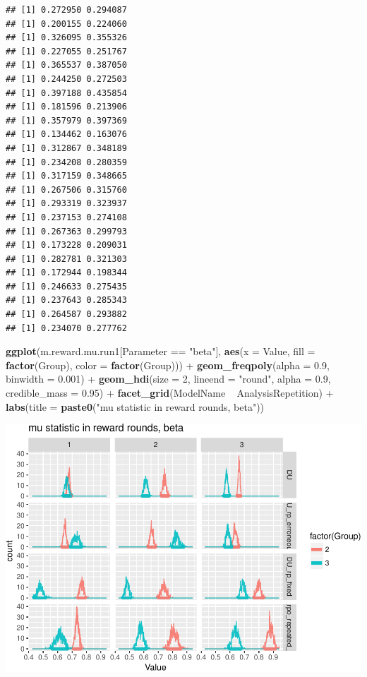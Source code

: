 \documentclass[]{article}
\newenvironment{Shaded}{\begin{snugshade}}{\end{snugshade}}
\newcommand{\KeywordTok}[1]{\textcolor[rgb]{0.13,0.29,0.53}{\textbf{{#1}}}}
\newcommand{\DataTypeTok}[1]{\textcolor[rgb]{0.13,0.29,0.53}{{#1}}}
\newcommand{\DecValTok}[1]{\textcolor[rgb]{0.00,0.00,0.81}{{#1}}}
\newcommand{\FloatTok}[1]{\textcolor[rgb]{0.00,0.00,0.81}{{#1}}}
\newcommand{\StringTok}[1]{\textcolor[rgb]{0.31,0.60,0.02}{{#1}}}
\newcommand{\NormalTok}[1]{{#1}}
\begin{document}
\begin{verbatim}
## [1] 0.272950 0.294087
## [1] 0.200155 0.224060
## [1] 0.326095 0.355326
## [1] 0.227055 0.251767
## [1] 0.365537 0.387050
## [1] 0.244250 0.272503
## [1] 0.397188 0.435854
## [1] 0.181596 0.213906
## [1] 0.357979 0.397369
## [1] 0.134462 0.163076
## [1] 0.312867 0.348189
## [1] 0.234208 0.280359
## [1] 0.317159 0.348665
## [1] 0.267506 0.315760
## [1] 0.293319 0.323937
## [1] 0.237153 0.274108
## [1] 0.267363 0.299793
## [1] 0.173228 0.209031
## [1] 0.282781 0.321303
## [1] 0.172944 0.198344
## [1] 0.246633 0.275435
## [1] 0.237643 0.285343
## [1] 0.264587 0.293882
## [1] 0.234070 0.277762
\end{verbatim}

\begin{Shaded}
\begin{Highlighting}[]
\KeywordTok{ggplot}\NormalTok{(m.reward.mu.run1[Parameter ==}\StringTok{ "beta"}\NormalTok{], }\KeywordTok{aes}\NormalTok{(}\DataTypeTok{x =} \NormalTok{Value, }\DataTypeTok{fill =} \KeywordTok{factor}\NormalTok{(Group), }
    \DataTypeTok{color =} \KeywordTok{factor}\NormalTok{(Group))) +}\StringTok{ }\KeywordTok{geom_freqpoly}\NormalTok{(}\DataTypeTok{alpha =} \FloatTok{0.9}\NormalTok{, }\DataTypeTok{binwidth =} \FloatTok{0.001}\NormalTok{) +}\StringTok{ }
\StringTok{    }\KeywordTok{geom_hdi}\NormalTok{(}\DataTypeTok{size =} \DecValTok{2}\NormalTok{, }\DataTypeTok{lineend =} \StringTok{"round"}\NormalTok{, }\DataTypeTok{alpha =} \FloatTok{0.9}\NormalTok{, }\DataTypeTok{credible_mass =} \FloatTok{0.95}\NormalTok{) +}\StringTok{ }
\StringTok{    }\KeywordTok{facet_grid}\NormalTok{(ModelName ~}\StringTok{ }\NormalTok{AnalysisRepetition) +}\StringTok{ }\KeywordTok{labs}\NormalTok{(}\DataTypeTok{title =} \KeywordTok{paste0}\NormalTok{(}\StringTok{"mu statistic in reward rounds, beta"}\NormalTok{))}
\end{Highlighting}
\end{Shaded}

\includegraphics{compare_models_files/figure-latex/AOVVisualize-2.pdf}
\end{document}
